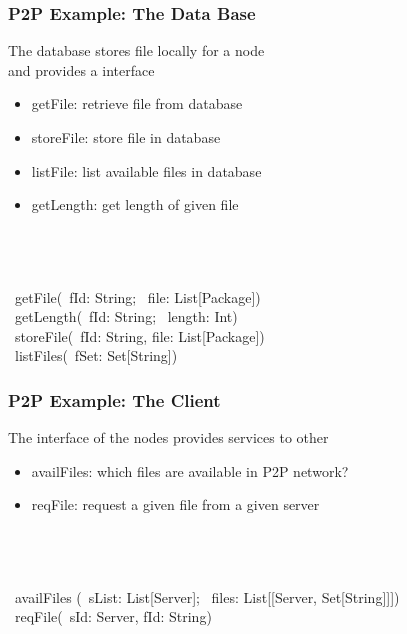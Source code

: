 \documentclass[handout]
{beamer}
\begin{document}
\begin{frame}
\frametitle{P2P Example: The Data Base}
The database stores file locally for a  node\\ 
and provides a  interface
\begin{itemize}
\item getFile: retrieve file from database
\item storeFile: store file in database
\item listFile: list available files in database
\item getLength: get length of given file
\end{itemize}

\bigskip
\pause

\begin{small}
\INTERFACE\ \\
\BEGIN\\
\innrykk \WITH\ \\
\innrykk \innrykk \OP\ getFile(\IN\ fId: String; \OUT\ file: List[Package])\\
\innrykk \innrykk \OP\ getLength(\IN\ fId: String; \OUT\ length: Int)\\
\innrykk \innrykk \OP\ storeFile(\IN\ fId: String, file: List[Package])\\
\innrykk \innrykk \OP\ listFiles(\OUT\ fSet: Set[String])\\
\END
\end{small}
\end{frame}


\begin{frame}
\frametitle{P2P Example: The Client}
The  interface of the nodes provides services to other 
\begin{itemize}
\item availFiles: which files are available in P2P network?
\item reqFile: request a given file from a given server
\end{itemize}

\bigskip
\pause

\begin{small}
\INTERFACE\ \\
\BEGIN\\
\innrykk \WITH\  \\
\innrykk \innrykk \OP\ availFiles (\IN\ sList: List[Server]; \OUT\ files: List[[Server, Set[String]]])\\
\innrykk \innrykk \OP\ reqFile(\IN\ sId: Server, fId: String)\\
\END
\end{small}
\end{frame}
\end{document}
